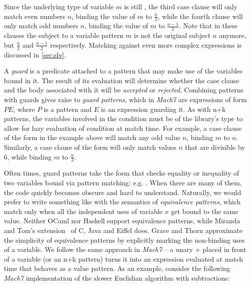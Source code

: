 Since the underlying type of variable $m$ is still , the third case 
clause will only match even numbers $n$, binding the value of $m$ to 
$\frac{n}{2}$, while the fourth clause will only match odd numbers $n$, binding 
the value of $m$ to $\frac{n-1}{2}$.  Note that in these clauses the subject to  
a variable pattern $m$ is not the original subject $n$ anymore, but 
$\frac{n}{2}$ and $\frac{n-1}{2}$ respectively. Matching against even more 
complex expressions is discussed in \textsection\ref{sec:slv}.

A \emph{guard} is a predicate attached to a pattern that may make use of the 
variables bound in it. The result of its evaluation will determine whether the 
case clause and the body associated with it will be \emph{accepted} or 
\emph{rejected}. Combining patterns with guards gives raise to \emph{guard 
patterns}, which in \emph{Mach7} are expressions of form $P$\code{|=}$E$, where $P$ is a 
pattern and $E$ is an expression guarding it. As with n+k patterns, the variables 
involved in the condition must be of the library's type  to allow 
for lazy evaluation of condition at match time. For example, a case clause of 
the form  in  the example above will match any odd value 
$n$, binding $m$ to $n$. Similarly, a case clause of the form  
will only match values $n$ that are divisible by 6, while binding $m$ to $\frac{n}{3}$.

Often times, guard patterns take the form that checks equality or inequality of 
two variables bound via pattern matching: e.g. . 
When there are many of them, the code quickly becomes obscure and hard to 
understand. Naturally, we would prefer to write something like  
with the semantics of \emph{equivalence patterns}, which match only when all the 
independent uses of variable $x$ get bound to the same value. 
Neither OCaml nor Haskell support equivalence patterns, while Miranda and Tom's 
extension~\cite{Moreau:2003} of C, Java and Eiffel does. Grace and Thorn 
approximate the simplicity of equivalence patterns by explicitly marking the 
non-binding uses of a variable. We follow the same approach in \emph{Mach7} -- a unary 
$+$ placed in front of a variable (or an n+k pattern) turns it into an 
expression evaluated at match time that behaves as a value pattern. As an 
example, consider the following \emph{Mach7} implementation of the slower 
Euclidian algorithm with subtractions:

